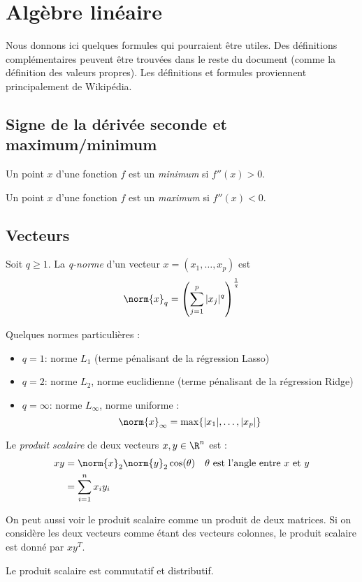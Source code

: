 \section{Algèbre linéaire}
    Nous donnons ici quelques formules qui pourraient être utiles. Des définitions complémentaires peuvent être trouvées dans le reste du document (comme la définition des valeurs propres). Les définitions et formules proviennent principalement de Wikipédia.

    \subsection{Signe de la dérivée seconde et maximum/minimum}
        Un point \(x\) d'une fonction \(f\) est un \textit{minimum} si \(f''(x) > 0\).

        Un point \(x\) d'une fonction \(f\) est un \textit{maximum} si \(f''(x) < 0\).

    \subsection{Vecteurs}
        \begin{definition}
            Soit \(q \geq 1\). La \textit{q-norme} d'un vecteur \(x = (x_1, \dots, x_p)\) est
            \[
                \norm{x}_q = \left(\sum_{j=1}^p |x_j|^q\right)^{\frac{1}{q}}
            \]

            Quelques normes particulières :
            \begin{itemize}
                \item \(q = 1\): norme \(L_1\) (terme pénalisant de la régression Lasso)
                \item \(q = 2\): norme \(L_2\), norme euclidienne (terme pénalisant de la régression Ridge)
                \item \(q = \infty\): norme \(L_\infty\), norme uniforme :
                \[
                    \norm{x}_\infty = \max\{|x_1|, \dots, |x_p|\}
                \]
            \end{itemize}
        \end{definition}

        \begin{definition}
            Le \textit{produit scalaire} de deux vecteurs \(x, y \in \R^n\) est :
            \begin{align*}
                xy &= \norm{x}_2 \norm{y}_2 \cos(\theta) & \theta \text{ est l'angle entre \(x\) et \(y\)} \\
                &= \sum_{i=1}^n x_i y_i
            \end{align*}

            On peut aussi voir le produit scalaire comme un produit de deux matrices. Si on considère les deux vecteurs comme étant des vecteurs colonnes, le produit scalaire est donné par \(xy^T\).

            Le produit scalaire est commutatif et distributif.
        \end{definition}


